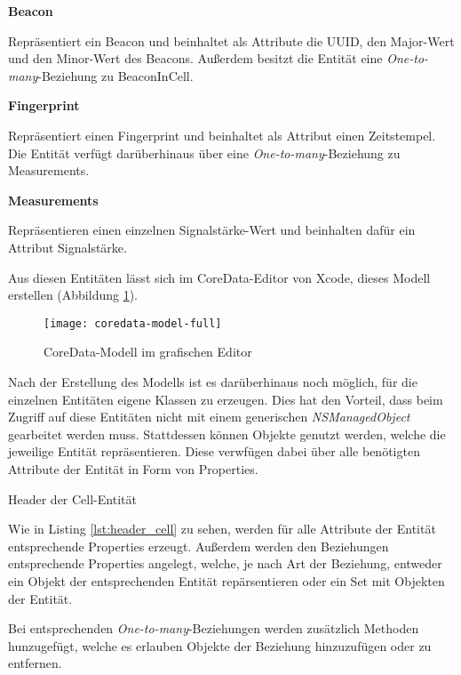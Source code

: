 \textbf{Beacon}

Repräsentiert ein Beacon und beinhaltet als Attribute die UUID, den Major-Wert und den Minor-Wert des Beacons.
Außerdem besitzt die Entität eine \emph{One-to-many}-Beziehung zu BeaconInCell.

\textbf{Fingerprint}

Repräsentiert einen Fingerprint und beinhaltet als Attribut einen Zeitstempel.
Die Entität verfügt darüberhinaus über eine \emph{One-to-many}-Beziehung zu Measurements.


\textbf{Measurements}

Repräsentieren einen einzelnen Signalstärke-Wert und beinhalten dafür ein Attribut Signalstärke.



Aus diesen Entitäten lässt sich im CoreData-Editor von Xcode, dieses Modell erstellen (Abbildung \ref{coredata-model-full}).

\begin{figure}[htb!]
		\centering
	\texttt{[image: coredata-model-full]}
	\caption{CoreData-Modell im grafischen Editor}
	\label{coredata-model-full}
\end{figure}


Nach der Erstellung des Modells ist es darüberhinaus noch möglich, für die einzelnen Entitäten eigene Klassen zu erzeugen. Dies hat den Vorteil, dass beim Zugriff auf diese Entitäten nicht mit einem generischen \emph{NSManagedObject} gearbeitet werden muss. Stattdessen können Objekte genutzt werden, welche die jeweilige Entität repräsentieren. Diese verwfügen dabei über alle benötigten Attribute der Entität in Form von Properties.

\begin{listing}[htb! breaklines=true]
    \caption{Header der Cell-Entität}
	\label{lst:header_cell}
\end{listing}

Wie in Listing \ref{lst:header_cell} zu sehen, werden für alle Attribute der Entität entsprechende Properties erzeugt. Außerdem werden den Beziehungen entsprechende Properties angelegt, welche, je nach Art der Beziehung, entweder ein Objekt der entsprechenden Entität repärsentieren oder ein Set mit Objekten der Entität.

Bei entsprechenden \emph{One-to-many}-Beziehungen werden zusätzlich Methoden hunzugefügt, welche es erlauben Objekte der Beziehung hinzuzufügen oder zu entfernen.

